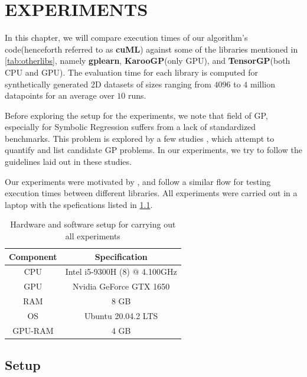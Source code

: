 \chapter{EXPERIMENTS}
\label{chap:experiments}

In this chapter, we will compare execution times of our algorithm's code(henceforth referred to as \textbf{cuML}) against some of the libraries mentioned in \cref{tab:otherlibs}, namely \textbf{gplearn}, \textbf{KarooGP}(only GPU), and \textbf{TensorGP}(both CPU and GPU). The evaluation time for each library is computed for synthetically generated 2D datasets of sizes ranging from $4096$ to $4$ million datapoints for an average over $10$ runs. 

Before exploring the setup for the experiments, we note that field of GP, especially for Symbolic Regression suffers from a lack of standardized benchmarks. This problem is explored by a few studies \citep{GP_Better_Benchmarks}\citep{Orzechowski_2018}, which attempt to quantify and list candidate GP problems. In our experiments, we try to follow the guidelines laid out in these studies.

Our experiments were motivated by \citep{baeta2021speed}, and follow a similar flow for testing execution times between different libraries. All experiments were carried out in a laptop with the spefications listed in \cref*{tab:laptop}.

\begin{table}[htbp]
  \caption{Hardware and software setup for carrying out all experiments}
  \begin{center}
      \begin{tabular}[c]{cc}%
        \toprule
        \textbf{Component} &   \textbf{Specification} \\
        \midrule
        CPU & Intel i5-9300H (8) @ 4.100GHz \\
        GPU & Nvidia GeForce GTX 1650       \\
        RAM & 8 GB                          \\
        OS  & Ubuntu 20.04.2 LTS            \\
        GPU-RAM& 4 GB          \\
        \bottomrule
      \end{tabular}
      \label{tab:laptop}
  \end{center}
\end{table}

\section{Setup}
\label{sec:setup}
